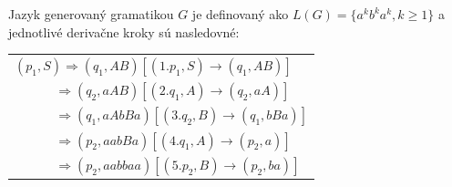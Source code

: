 Jazyk generovaný gramatikou $G$ je definovaný ako $L(G) = \{a^kb^ka^k, k\geq 1\}$ a jednotlivé derivačne kroky sú nasledovné: 
\begin{center}
\begin{tabular}{p{20em}} 
$(p_1, S) \Rightarrow (q_1, AB) [(1.p_1, S) \to (q_1, AB)]$\\
\item $ \quad\quad\quad\, \Rightarrow (q_2, aAB) [ (2.q_1, A) \to (q_2,aA)]$\\
\item $ \quad\quad\quad\,\Rightarrow (q_1, aAbBa) [ (3.q_2, B) \to (q_1, bBa)]$\\
\item$ \quad\quad\quad\, \Rightarrow (p_2, aabBa) [ (4.q_1, A) \to (p_2,a)]$\\
\item$ \quad\quad\quad\, \Rightarrow (p_2, aabbaa) [(5.p_2, B) \to (p_2, ba)]$
\end{tabular}
\end{center}

